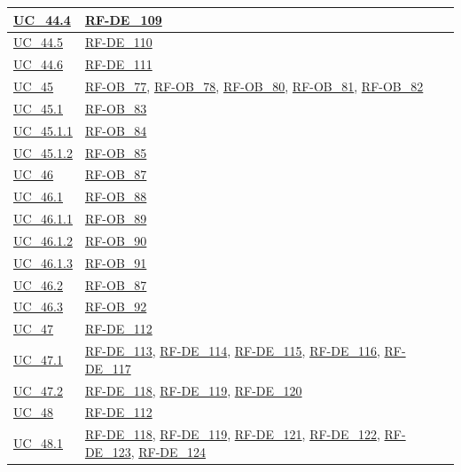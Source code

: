 \begin{longtable}{|
        >{\raggedright\arraybackslash}p{} |
        >{\raggedright\arraybackslash}p{} |
    }
    \hline
    \hyperref[uc_44.4]{UC\_44.4} & \hyperlink{rf-de_109}{RF-DE\_109} \\
    \hline
    \hyperref[uc_44.5]{UC\_44.5} & \hyperlink{rf-de_110}{RF-DE\_110} \\
    \hline
    \hyperref[uc_44.6]{UC\_44.6} & \hyperlink{rf-de_111}{RF-DE\_111} \\
    \hline
    \hyperref[uc_45]{UC\_45} & \hyperlink{rf-ob_77}{RF-OB\_77}, \hyperlink{rf-ob_78}{RF-OB\_78}, \hyperlink{rf-ob_80}{RF-OB\_80}, \hyperlink{rf-ob_81}{RF-OB\_81}, \hyperlink{rf-ob_82}{RF-OB\_82} \\
    \hline
    \hyperref[uc_45.1]{UC\_45.1} & \hyperlink{rf-ob_83}{RF-OB\_83} \\
    \hline
    \hyperref[uc_45.1.1]{UC\_45.1.1} & \hyperlink{rf-ob_84}{RF-OB\_84} \\
    \hline
    \hyperref[uc_45.1.2]{UC\_45.1.2} & \hyperlink{rf-ob_85}{RF-OB\_85} \\
    \hline
    \hyperref[uc_46]{UC\_46} & \hyperlink{rf-ob_87}{RF-OB\_87} \\
    \hline
    \hyperref[uc_46.1]{UC\_46.1} & \hyperlink{rf-ob_88}{RF-OB\_88} \\
    \hline
    \hyperref[uc_46.1.1]{UC\_46.1.1} & \hyperlink{rf-ob_89}{RF-OB\_89} \\
    \hline
    \hyperref[uc_46.1.2]{UC\_46.1.2} & \hyperlink{rf-ob_90}{RF-OB\_90} \\
    \hline
    \hyperref[uc_46.1.3]{UC\_46.1.3} & \hyperlink{rf-ob_91}{RF-OB\_91} \\
    \hline
    \hyperref[uc_46.2]{UC\_46.2} & \hyperlink{rf-ob_87}{RF-OB\_87} \\
    \hline
    \hyperref[uc_46.3]{UC\_46.3} & \hyperlink{rf-ob_92}{RF-OB\_92} \\
    \hline
    \hyperref[uc_47]{UC\_47} & \hyperlink{rf-de_112}{RF-DE\_112} \\
    \hline
    \hyperref[uc_47.1]{UC\_47.1} & \hyperlink{rf-de_113}{RF-DE\_113}, \hyperlink{rf-de_114}{RF-DE\_114}, \hyperlink{rf-de_115}{RF-DE\_115}, \hyperlink{rf-de_116}{RF-DE\_116}, \hyperlink{rf-de_117}{RF-DE\_117} \\
    \hline
    \hyperref[uc_47.2]{UC\_47.2} & \hyperlink{rf-de_118}{RF-DE\_118}, \hyperlink{rf-de_119}{RF-DE\_119}, \hyperlink{rf-de_120}{RF-DE\_120} \\
    \hline
    \hyperref[uc_48]{UC\_48} & \hyperlink{rf-de_112}{RF-DE\_112} \\
    \hline
    \hyperref[uc_48.1]{UC\_48.1} & \hyperlink{rf-de_118}{RF-DE\_118}, \hyperlink{rf-de_119}{RF-DE\_119}, \hyperlink{rf-de_121}{RF-DE\_121}, \hyperlink{rf-de_122}{RF-DE\_122}, \hyperlink{rf-de_123}{RF-DE\_123}, \hyperlink{rf-de_124}{RF-DE\_124} \\

\end{longtable}
